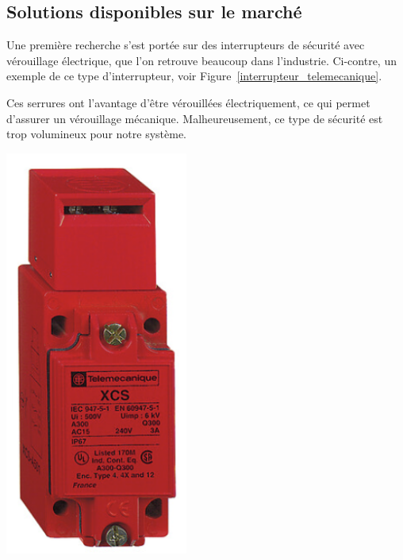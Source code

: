 \subsection{Solutions disponibles sur le marché}
\begin{minipage}[c]{0.6\textwidth}
    Une première recherche s'est portée sur des interrupteurs de sécurité avec vérouillage électrique, que l'on retrouve beaucoup dans l'industrie. Ci-contre, un exemple de ce type d'interrupteur, voir Figure~\ref{interrupteur_telemecanique}.

    Ces serrures ont l'avantage d'être vérouillées électriquement, ce qui permet d'assurer un vérouillage mécanique. Malheureusement, ce type de sécurité est trop volumineux pour notre système.
\end{minipage}\hfill
\begin{minipage}[c]{0.35\textwidth}
    \begin{center}
        \includegraphics[width=0.45\textwidth]{assets/figures/Protections_laser/Securite_electrique/serrure_telemecanique.png}
    \end{center}
    \label{interrupteur_telemecanique}
\end{minipage}

